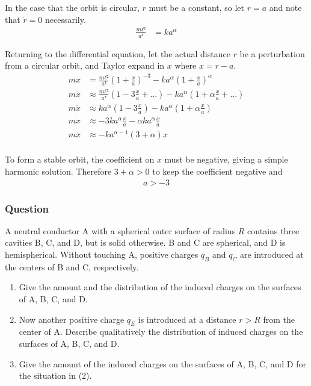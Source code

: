 In the case that the orbit is circular, $r$ must be a constant, so let $r = a$
and note that $\ddot r = 0$ necessarily.
\begin{align*}
	\frac{mℓ²}{a³} &= ka^α
\end{align*}

Returning to the differential equation, let the actual distance $r$ be a
perturbation from a circular orbit, and Taylor expand in $x$ where $x = r - a$.
\begin{align*}
	m\ddot x &= \frac{mℓ²}{a³} (1 + \frac{x}{a} )^{-3} -
		ka^α \left(1 + \frac{x}{a} \right)^α \\
	m\ddot x &≈ \frac{mℓ²}{a³} (1 - 3\frac{x}{a} + \ldots ) -
		ka^α (1 + α\frac{x}{a} + \ldots ) \\
	m\ddot x &≈ ka^α (1 - 3\frac{x}{a} ) -
		ka^α (1 + α\frac{x}{a} ) \\
	m\ddot x &≈ -3ka^α \frac{x}{a} - αka^α\frac{x}{a} \\
	m\ddot x &≈ -ka^{α-1} (3+α)x \\
\end{align*}

To form a stable orbit, the coefficient on $x$ must be negative, giving a simple
harmonic solution. Therefore $3+α > 0$ to keep the coefficient negative and
\begin{align}
	\boxed{
	a > -3
	}
\end{align}

\subsubsection{Question}

A neutral conductor A with a spherical outer surface of radius $R$ contains
three cavities B, C, and D, but is solid otherwise. B and C are spherical, and
D is hemispherical. Without touching A, positive charges $q_B$ and $q_C$ are
introduced at the centers of B and C, respectively.
\begin{enumerate}
	\item
		Give the amount and the distribution of the induced charges on the
		surfaces of A, B, C, and D.
	\item
		Now another positive charge $q_E$ is introduced at a distance $r > R$
		from the center of A. Describe qualitatively the distribution of
		induced charges on the surfaces of A, B, C, and D.
	\item
		Give the amount of the induced charges on the surfaces of A, B, C, and
		D for the situation in (2).
\end{enumerate}

